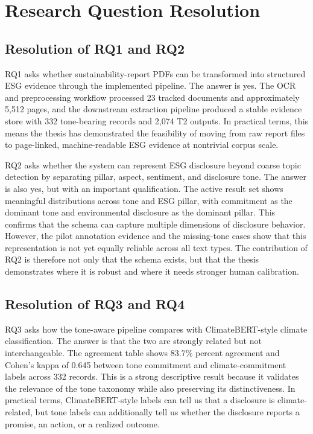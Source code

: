 \documentclass[english, online, cse, master]{dithesis}
\begin{document}
\section{Research Question Resolution}

\subsection{Resolution of RQ1 and RQ2}

RQ1 asks whether sustainability-report PDFs can be transformed into structured ESG evidence through the implemented pipeline. The answer is yes. The OCR and preprocessing workflow processed 23 tracked documents and approximately 5,512 pages, and the downstream extraction pipeline produced a stable evidence store with 332 tone-bearing records and 2,074 T2 outputs. In practical terms, this means the thesis has demonstrated the feasibility of moving from raw report files to page-linked, machine-readable ESG evidence at nontrivial corpus scale.

RQ2 asks whether the system can represent ESG disclosure beyond coarse topic detection by separating pillar, aspect, sentiment, and disclosure tone. The answer is also yes, but with an important qualification. The active result set shows meaningful distributions across tone and ESG pillar, with commitment as the dominant tone and environmental disclosure as the dominant pillar. This confirms that the schema can capture multiple dimensions of disclosure behavior. However, the pilot annotation evidence and the missing-tone cases show that this representation is not yet equally reliable across all text types. The contribution of RQ2 is therefore not only that the schema exists, but that the thesis demonstrates where it is robust and where it needs stronger human calibration.

\subsection{Resolution of RQ3 and RQ4}

RQ3 asks how the tone-aware pipeline compares with ClimateBERT-style climate classification. The answer is that the two are strongly related but not interchangeable. The agreement table shows 83.7\% percent agreement and Cohen’s kappa of 0.645 between tone commitment and climate-commitment labels across 332 records. This is a strong descriptive result because it validates the relevance of the tone taxonomy while also preserving its distinctiveness. In practical terms, ClimateBERT-style labels can tell us that a disclosure is climate-related, but tone labels can additionally tell us whether the disclosure reports a promise, an action, or a realized outcome.
\end{document}
